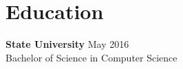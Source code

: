 \section{Education}
\begin{itemize}[leftmargin=0.0in,label={}]
  \small{\item{
    \textbf{State University} \hfill May 2016 \\
    Bachelor of Science in Computer Science
  }}
\end{itemize}
